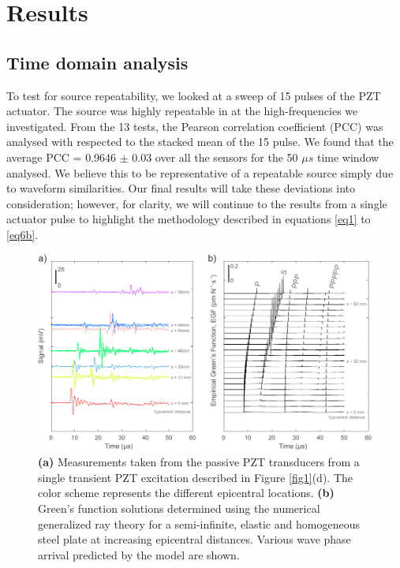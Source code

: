 \documentclass[preprint,3p, 11pt,authoryear]{elsarticle}
\begin{document}
\section{Results}
\label{results}
\subsection{Time domain analysis}
To test for source repeatability, we looked at a sweep of 15 pulses of the PZT actuator. The source was highly repeatable in at the high-frequencies we investigated.  From the 13 tests, the Pearson correlation coefficient (PCC) was analysed with respected to the stacked mean of the 15 pulse. We found that the average PCC = 0.9646 $\pm$ 0.03 over all the sensors for the 50 $\mu s$ time window analysed. We believe this to be representative of a repeatable source simply due to waveform similarities. Our final results will take these deviations into consideration; however, for clarity, we will continue to the results from a single actuator pulse to highlight the methodology described in equations \eqref{eq1} to \eqref{eq6b}.

\begin{figure}[ht]
     	\centering
\includegraphics[scale= 1.0]{FIG3.pdf} 
\caption{\textbf{(a)} Measurements taken from the passive PZT transducers from a single transient PZT excitation described in Figure \ref{fig1}(d). The color scheme represents the different epicentral locations.  \textbf{(b)} Green's function solutions determined using the numerical generalized ray theory for a semi-infinite, elastic and homogeneous steel plate at increasing epicentral distances.  Various wave phase arrival predicted by the model are shown.}
	\label{fig3} 
\end{figure}
\end{document}
